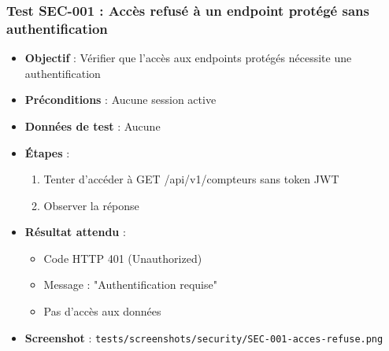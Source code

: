 \subsubsection{Test SEC-001 : Accès refusé à un endpoint protégé sans authentification}
\begin{itemize}
    \item \textbf{Objectif} : Vérifier que l'accès aux endpoints protégés nécessite une authentification
    \item \textbf{Préconditions} : Aucune session active
    \item \textbf{Données de test} : Aucune
    \item \textbf{Étapes} :
        \begin{enumerate}
            \item Tenter d'accéder à GET /api/v1/compteurs sans token JWT
            \item Observer la réponse
        \end{enumerate}
    \item \textbf{Résultat attendu} : 
        \begin{itemize}
            \item Code HTTP 401 (Unauthorized)
            \item Message : "Authentification requise"
            \item Pas d'accès aux données
        \end{itemize}
    \item \textbf{Screenshot} : \texttt{tests/screenshots/security/SEC-001-acces-refuse.png}
\end{itemize}

